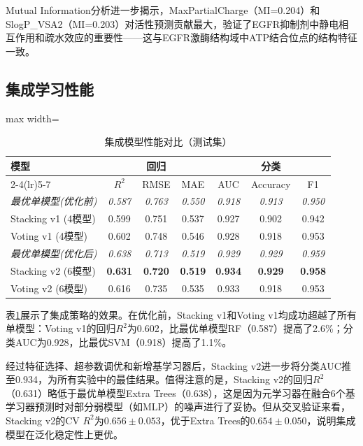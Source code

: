\documentclass[12pt,a4paper]{article}
\begin{document}
Mutual Information分析进一步揭示，MaxPartialCharge（MI=0.204）和SlogP\_VSA2（MI=0.203）对活性预测贡献最大，验证了EGFR抑制剂中静电相互作用和疏水效应的重要性——这与EGFR激酶结构域中ATP结合位点的结构特征一致。

\subsection{集成学习性能}

\begin{table}[H]
\centering
\caption{集成模型性能对比（测试集）}
\label{tab:ensemble}
\begin{adjustbox}{max width=\textwidth}
\begin{tabular}{lcccccc}
\toprule
\multirow{2}{*}{模型} & \multicolumn{3}{c}{回归} & \multicolumn{3}{c}{分类} \\
\cmidrule(lr){2-4}\cmidrule(lr){5-7}
 & $R^2$ & RMSE & MAE & AUC & Accuracy & F1 \\
\midrule
\textit{最优单模型(优化前)} & \textit{0.587} & \textit{0.763} & \textit{0.550} & \textit{0.918} & \textit{0.913} & \textit{0.950} \\
Stacking v1 (4模型) & 0.599 & 0.751 & 0.537 & 0.927 & 0.902 & 0.942 \\
Voting v1 (4模型) & 0.602 & 0.748 & 0.546 & 0.928 & 0.918 & 0.953 \\
\midrule
\textit{最优单模型(优化后)} & \textit{0.638} & \textit{0.713} & \textit{0.519} & \textit{0.929} & \textit{0.929} & \textit{0.959} \\
Stacking v2 (6模型) & \textbf{0.631} & \textbf{0.720} & \textbf{0.519} & \textbf{0.934} & \textbf{0.929} & \textbf{0.958} \\
Voting v2 (6模型) & 0.616 & 0.735 & 0.535 & 0.933 & 0.918 & 0.953 \\
\bottomrule
\end{tabular}
\end{adjustbox}
\end{table}

表\ref{tab:ensemble}展示了集成策略的效果。在优化前，Stacking v1和Voting v1均成功超越了所有单模型：Voting v1的回归$R^2$为0.602，比最优单模型RF（0.587）提高了2.6\%；分类AUC为0.928，比最优SVM（0.918）提高了1.1\%。

经过特征选择、超参数调优和新增基学习器后，Stacking v2进一步将分类AUC推至0.934，为所有实验中的最佳结果。值得注意的是，Stacking v2的回归$R^2$（0.631）略低于最优单模型Extra Trees（0.638），这是因为元学习器在融合6个基学习器预测时对部分弱模型（如MLP）的噪声进行了妥协。但从交叉验证来看，Stacking v2的CV $R^2$为$0.656 \pm 0.053$，优于Extra Trees的$0.654 \pm 0.050$，说明集成模型在泛化稳定性上更优。
\end{document}
